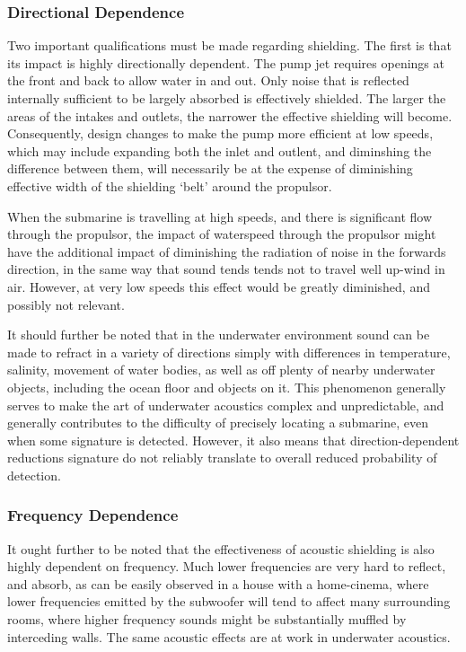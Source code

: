 \documentclass{article}\usepackage[]{graphicx}\usepackage[]{color}
\begin{document}
\subsubsection{Directional Dependence}
Two important qualifications must be made regarding shielding.  The first is that its impact is highly directionally dependent.  The pump jet requires openings at the front and back to allow water in and out. Only noise that is reflected internally sufficient to be largely absorbed is effectively shielded.  The larger the areas of the intakes and outlets, the narrower the effective shielding will become.  Consequently, design changes to make the pump more efficient at low speeds, which may include expanding both the inlet and outlent, and diminshing the difference between them, will necessarily be at the expense of diminishing effective width of the shielding `belt' around the propulsor.

When the submarine is travelling at high speeds, and there is significant flow through the propulsor, the impact of waterspeed through the propulsor might have the additional impact of diminishing the radiation of noise in the forwards direction, in the same way that sound tends tends not to travel well up-wind in air.  However, at very low speeds this effect would be greatly diminished, and possibly not relevant.

It should further be noted that in the underwater environment sound can be made to refract in a variety of directions simply with differences in temperature, salinity, movement of water bodies, as well as off plenty of nearby underwater objects, including the ocean floor and objects on it.  This phenomenon generally serves to make the art of underwater acoustics complex and unpredictable, and generally contributes to the difficulty of precisely locating a submarine, even when some signature is detected.  However, it also means that direction-dependent reductions signature do not reliably translate to overall reduced probability of detection.

\subsubsection{Frequency Dependence}
It ought further to be noted that the effectiveness of acoustic shielding is also highly dependent on frequency.  Much lower frequencies are very hard to reflect, and absorb, as can be easily observed in a house with a home-cinema, where lower frequencies emitted by the subwoofer will tend to affect many surrounding rooms, where higher frequency sounds might be substantially muffled by interceding walls. The same acoustic effects are at work in underwater acoustics.
\end{document}
